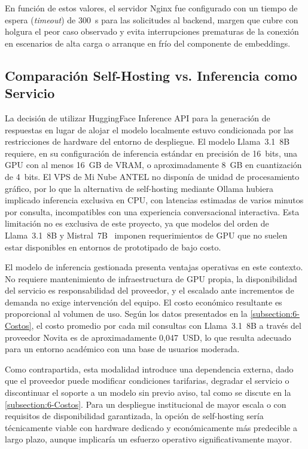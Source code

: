 En función de estos valores, el servidor Nginx fue configurado con un tiempo de espera (\textit{timeout}) de 300~s para las solicitudes al backend, margen que cubre con holgura el peor caso observado y evita interrupciones prematuras de la conexión en escenarios de alta carga o arranque en frío del componente de embeddings.

\subsection{Comparación Self-Hosting vs. Inferencia como Servicio}
\label{subsection:6-Selfhosting}

La decisión de utilizar HuggingFace Inference API para la generación de respuestas en lugar de alojar el modelo localmente estuvo condicionada por las restricciones de hardware del entorno de despliegue. El modelo Llama~3.1~8B~\cite{touvron2023llama2} requiere, en su configuración de inferencia estándar en precisión de 16~bits, una GPU con al menos 16~GB de VRAM, o aproximadamente 8~GB en cuantización de 4~bits. El VPS de Mi Nube ANTEL no disponía de unidad de procesamiento gráfico, por lo que la alternativa de self-hosting mediante Ollama hubiera implicado inferencia exclusiva en CPU, con latencias estimadas de varios minutos por consulta, incompatibles con una experiencia conversacional interactiva. Esta limitación no es exclusiva de este proyecto, ya que modelos del orden de Llama~3.1~8B y Mistral~7B~\cite{jiang2023mistral} imponen requerimientos de GPU que no suelen estar disponibles en entornos de prototipado de bajo costo.

El modelo de inferencia gestionada presenta ventajas operativas en este contexto. No requiere mantenimiento de infraestructura de GPU propia, la disponibilidad del servicio es responsabilidad del proveedor, y el escalado ante incrementos de demanda no exige intervención del equipo. El costo económico resultante es proporcional al volumen de uso. Según los datos presentados en la \autoref{subsection:6-Costos}, el costo promedio por cada mil consultas con Llama~3.1~8B a través del proveedor Novita es de aproximadamente 0,047~USD, lo que resulta adecuado para un entorno académico con una base de usuarios moderada.

Como contrapartida, esta modalidad introduce una dependencia externa, dado que el proveedor puede modificar condiciones tarifarias, degradar el servicio o discontinuar el soporte a un modelo sin previo aviso, tal como se discute en la \autoref{subsection:6-Costos}. Para un despliegue institucional de mayor escala o con requisitos de disponibilidad garantizada, la opción de self-hosting sería técnicamente viable con hardware dedicado y económicamente más predecible a largo plazo, aunque implicaría un esfuerzo operativo significativamente mayor.


